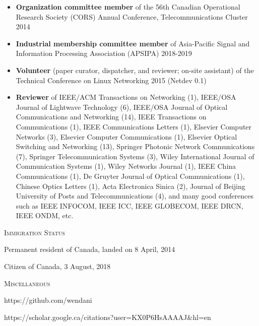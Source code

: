 \documentclass[letterpaper,11pt]{article}
\newcommand{\resheading}[1]{{\noindent\large \colorbox{mygrey}{
\begin{minipage}{1.0\textwidth}{\textsc{#1 \vphantom{p\^{E}}}}\end{minipage}}}}
\begin{document}
\begin{itemize}
\item
\textbf{Organization committee member} of the 56th Canadian Operational Research Society (CORS) Annual Conference, Telecommunications Cluster 2014

\item
\textbf{Industrial membership committee member} of Asia-Pacific Signal and Information Processing Association (APSIPA) 2018-2019

\item
\textbf{Volunteer} (paper curator, dispatcher, and reviewer; on-site assistant) of the Technical Conference on Linux Networking 2015 (Netdev 0.1)

\item
\textbf{Reviewer} of IEEE/ACM Transactions on Networking (1), IEEE/OSA Journal of Lightwave Technology (6),
IEEE/OSA Journal of Optical Communications and Networking (14), IEEE Transactions on Communications (1), IEEE Communications Letters (1),
Elsevier Computer Networks (3), Elsevier Computer Communications (1), Elsevier Optical Switching and Networking (13),
Springer Photonic Network Communications (7), Springer Telecommunication Systems (3), Wiley International Journal of Communication Systems (1),
Wiley Networks Journal (1), IEEE China Communications (1), De Gruyter Journal of Optical Communications (1), Chinese Optics Letters (1),
Acta Electronica Sinica (2), Journal of Beijing University of Posts and Telecommunications (4),
and many good conferences such as IEEE INFOCOM, IEEE ICC, IEEE GLOBECOM, IEEE DRCN, IEEE ONDM, etc.

\end{itemize}




\resheading{Immigration Status}%
\vspace{0.15in} %

\leftskip 0.2in %

Permanent resident of Canada, landed on 8 April, 2014

Citizen of Canada, 3 August, 2018

\leftskip 0.0in




\vspace{0.1in}
\resheading{Miscellaneous}
\begin{description}
\setlength{\itemindent}{-0.1in}
\item[GitHub:] https://github.com/wendani

\item[Google Scholar:] https://scholar.google.ca/citations?user=KX0P6HsAAAAJ\&hl=en
\end{description}
\end{document}
